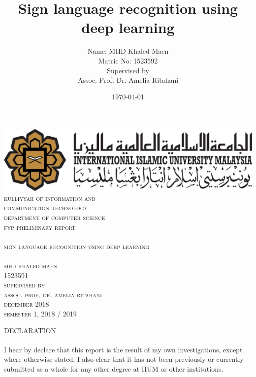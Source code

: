 \documentclass[12pt]{report}
\title{Sign language recognition using deep learning}
\author{ Name: MHD Khaled Maen\\
        Matric No: 1523592 \\ 
        [1.5cm]
        Supervised by\\
        Assoc. Prof. Dr. Amelia Ritahani \\}
\date{\today}
\begin{document}
        \begin{titlepage}
            \center
            \includegraphics[width = 15 cm]{./images/iium.png}
            \textsc{\LARGE }\\[1.5cm]
            \textsc{\LARGE kulliyyah of information and}\\[.2 cm]
            \textsc{\LARGE communication technology}\\[1.5cm]
            \textsc{\Large department of computer science}\\ [ .4 cm]
            \textsc{\large fyp preliminary report}\\ [1 cm]
            \hrulefill \\[0.4cm]
            \textsc{\Large sign language recognition using deep learning}\\
            \hrulefill \\[2 cm]

            \textsc{\large mhd khaled maen}\\[.2 cm]
            \textsc{1523591}\\ [2 cm]
             

            \textsc{\large supervised by}\\[.2 cm]
            \textsc{\large assoc. prof. dr. amelia ritahani}\\[2 cm]

            \textsc{\large december} 2018\\ [.2 cm]
            \textsc{\large semester} 1, 2018 / 2019 \\

        \end{titlepage}

    \begin{center}
        \LARGE DECLARATION
    \end{center}        
    \paragraph{}
        I hear by declare that this report is the result of my own investigations,
        except where otherwise stated. I also clear that it 
        has not been previously or currently submitted as a whole for any other degree 
        at IIUM or other institutions.
\end{document}

